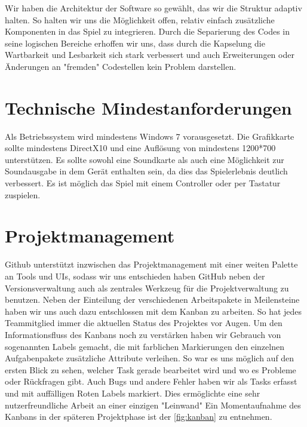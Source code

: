 \documentclass{article}
\begin{document}
Wir haben die Architektur der Software so gewählt, das wir die Struktur adaptiv halten. So halten wir uns die Möglichkeit offen, relativ einfach zusätzliche Komponenten in das Spiel zu integrieren.
Durch die Separierung des Codes in seine logischen Bereiche erhoffen wir uns, dass durch die Kapselung die Wartbarkeit und Lesbarkeit sich stark verbessert und auch Erweiterungen oder Änderungen an "fremden" Codestellen kein Problem darstellen.
\newline

\newpage
\section{Technische Mindestanforderungen}


Als Betriebssystem wird mindestens Windows 7 vorausgesetzt. Die Grafikkarte sollte mindestens DirectX10 und eine Auflösung von mindestens 1200*700 unterstützen. Es sollte sowohl eine
Soundkarte als auch eine Möglichkeit zur Soundausgabe in dem Gerät enthalten sein, da dies das Spielerlebnis deutlich verbessert.
Es ist möglich das Spiel mit einem Controller oder per Tastatur zuspielen.\newline

\vspace{1cm}
\section{Projektmanagement}


Github unterstützt inzwischen das Projektmanagement mit einer weiten Palette an Tools und UIs, sodass wir uns entschieden haben GitHub neben der Versionsverwaltung auch als zentrales Werkzeug für die Projektverwaltung zu benutzen.
Neben der Einteilung der verschiedenen Arbeitspakete in Meilensteine haben wir uns auch dazu entschlossen mit dem Kanban zu arbeiten. So hat jedes Teammitglied immer die aktuellen Status des Projektes vor Augen. Um den Informationsfluss des Kanbans noch zu verstärken haben wir Gebrauch von sogenannten Labels gemacht, die mit farblichen Markierungen den einzelnen Aufgabenpakete zusätzliche Attribute verleihen. So war es uns möglich auf den ersten Blick zu sehen, welcher Task gerade bearbeitet wird und wo es Probleme oder Rückfragen gibt. Auch Bugs und andere Fehler haben wir als Tasks erfasst und mit auffälligen Roten Labels markiert. Dies ermöglichte eine sehr nutzerfreundliche Arbeit an einer einzigen "Leinwand" 
Ein Momentaufnahme des Kanbans in der späteren Projektphase ist der \ref{fig:kanban} zu entnehmen.
\end{document}
